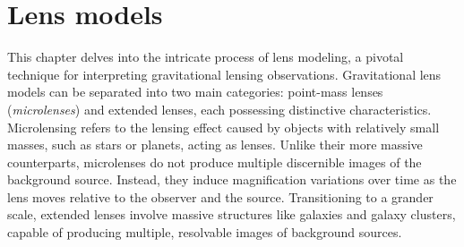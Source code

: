 \chapter[Lens models]{Lens models}
\label{chap:lens_models}

This chapter delves into the intricate process of lens modeling, a pivotal technique for interpreting gravitational lensing observations. Gravitational lens models can be separated into two main categories: point-mass lenses (\ie \emph{microlenses}) and extended lenses, each possessing distinctive characteristics.
Microlensing refers to the lensing effect caused by objects with relatively small masses, such as stars or planets, acting as lenses. Unlike their more massive counterparts, microlenses do not produce multiple discernible images of the background source. Instead, they induce magnification variations over time as the lens moves relative to the observer and the source. 
Transitioning to a grander scale, extended lenses involve massive structures like galaxies and galaxy clusters, capable of producing multiple, resolvable images of background sources. 



